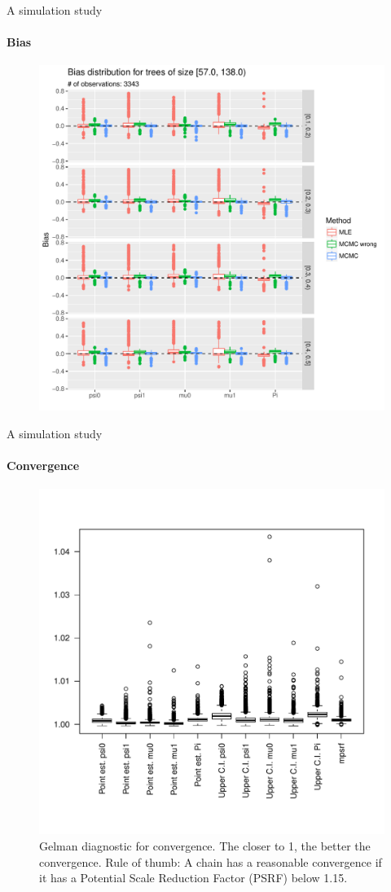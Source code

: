 \documentclass[9pt,ignorenonframetext,]{beamer}
\begin{document}
\begin{frame}[t]{A simulation study}

\framesubtitle{Bias}

\begin{figure}
\centering
\includegraphics[width=.68\linewidth]{bias_trees_of_size_[57,138).pdf}
\end{figure}

\end{frame}

\begin{frame}[t]{A simulation study}

\framesubtitle{Convergence}

\begin{figure}
\centering
\includegraphics[width=.6\linewidth, trim={0 1.5cm 0 2cm},clip]{gelmans_right_prior.pdf}
\caption{Gelman diagnostic for convergence. The closer to 1, the better the convergence. Rule of thumb: A chain has a reasonable convergence if it has a Potential Scale Reduction Factor (PSRF) below 1.15.}
\end{figure}

\end{frame}
\end{document}
